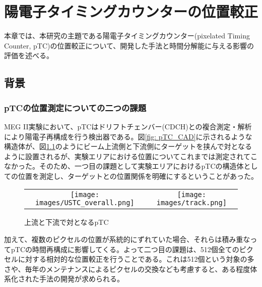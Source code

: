 \documentclass[Yonemoto_master.tex]{subfiles}
\begin{document}
\chapter{陽電子タイミングカウンターの位置較正}
本章では、本研究の主題である陽電子タイミングカウンター(pixelated Timing Counter, pTC)の位置較正について、開発した手法と時間分解能に与える影響の評価を述べる。

\section{背景}
\subsection{pTCの位置測定についての二つの課題}
MEG II実験において、pTCはドリフトチェンバー(CDCH)との複合測定・解析により陽電子再構成を行う検出器である。図\ref{fig: pTC_CAD}に示されるような構造体が、図\ref{fig: double_pTC}のようにビーム上流側と下流側にターゲットを挟んで対となるように設置されるが、実験エリアにおける位置についてこれまでは測定されてこなかった。そのため、一つ目の課題として実験エリアにおけるpTCの構造体としての位置を測定し、ターゲットとの位置関係を明確にするということがあった。

\begin{figure}[h]
    \begin{tabular}{cc}
      \begin{minipage}[t]{0.45\hsize}
        \centering
        \texttt{[image: images/USTC\_overall.png]}
        \caption{CADにおける上流側pTCの概観}
        \label{fig: pTC_CAD}
      \end{minipage} &
      \begin{minipage}[t]{0.45\hsize}
        \centering
        \texttt{[image: images/track.png]}
        \caption{上流と下流で対となるpTC}
        \label{fig: double_pTC}
      \end{minipage}
    \end{tabular}
  \end{figure}
加えて、複数のピクセルの位置が系統的にずれていた場合、それらは積み重なってpTCの時間再構成に影響してくる。よって二つ目の課題は、512個全てのピクセルに対する相対的な位置較正を行うことである。これは512個という対象の多さや、毎年のメンテナンスによるピクセルの交換なども考慮すると、ある程度体系化された手法の開発が求められる。
\end{document}

